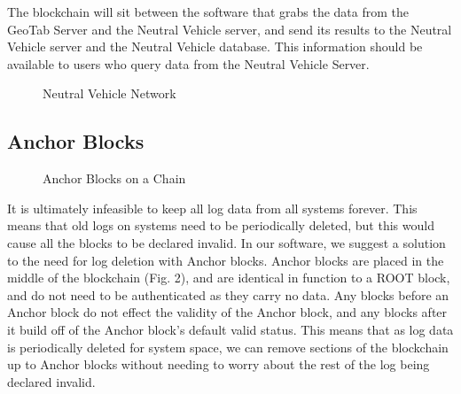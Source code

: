         The blockchain will sit between the software that grabs the data from the GeoTab Server and the Neutral Vehicle server, and send its results to the Neutral Vehicle server and the Neutral Vehicle database. This information should be available to users who query data from the Neutral Vehicle Server.

\begin{figure}[hbt!]
\centering
  \caption{Neutral Vehicle Network}
\end{figure}

\subsection{Anchor Blocks}
        \begin{figure}[hbt!]
        \centering
        \caption{Anchor Blocks on a Chain}
        \end{figure} %
        
        It is ultimately infeasible to keep all log data from all systems forever. This means that old logs on systems need to be periodically deleted, but this would cause all the blocks to be declared invalid. In our software, we suggest a solution to the need for log deletion with Anchor blocks.   Anchor blocks are placed in the middle of the blockchain (Fig. 2), and are identical in function to a ROOT block, and do not need to be authenticated as they carry no data. Any blocks before an Anchor block do not effect the validity of the Anchor block, and any blocks after it build off of the Anchor block's default valid status. This means that as log data is periodically deleted for system space, we can remove sections of the blockchain up to Anchor blocks without needing to worry about the rest of the log being declared invalid.
        
